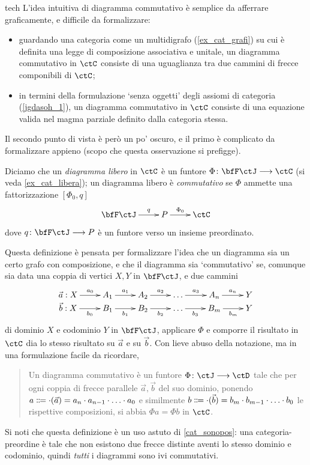 \begin{hRemark}{tech}\label{cos_diag_comm}
 L'idea intuitiva di diagramma commutativo è semplice da afferrare graficamente, e difficile da formalizzare:
 \begin{itemize}
  \item guardando una categoria come un multidigrafo (\ref{ex_cat_grafi}) su cui è definita una legge di composizione associativa e unitale, un diagramma commutativo in \(\ctC\) consiste di una uguaglianza tra due cammini di frecce componibili di \(\ctC\);
  \item in termini della formulazione `senza oggetti' degli assiomi di categoria (\ref{jgdasoh_1}), un diagramma commutativo in \(\ctC\) consiste di una equazione valida nel magma parziale definito dalla categoria stessa.
 \end{itemize}
 Il secondo punto di vista è però un po' oscuro, e il primo è complicato da formalizzare appieno (scopo che questa osservazione si prefigge).

 Diciamo che un \emph{diagramma libero} in \(\ctC\) è un funtore \(\Phi \colon \bfF\ctJ \fun\ctC\) (si veda \ref{ex_cat_libera}); un diagramma libero è \emph{commutativo} se \(\Phi\) ammette una fattorizzazione \([\Phi_0,q]\)
 \[\xymatrix{
  \bfF\ctJ \ar[r]^-q & P \ar[r]^-{\Phi_0} & \ctC
  }\]
 dove \(q \colon \bfF\ctJ \fun P\) è un funtore verso un insieme preordinato.

 Questa definizione è pensata per formalizzare l'idea che un diagramma sia un certo grafo con composizione, e che il diagramma sia `commutativo' se, comunque sia data una coppia di vertici \(X,Y\) in \(\bfF\ctJ\), e due cammini
 \[\xymatrix@R=0cm{
  \vec a : X \ar[r]^-{a_0} & A_1 \ar[r]^-{a_1} & A_2 \ar[r]^-{a_2}  & \dots \ar[r]^-{a_3} & A_n \ar[r]^-{a_n} & Y\\
  \vec b : X \ar[r]_-{b_0} & B_1 \ar[r]_-{b_1} & B_2 \ar[r]_-{b_2} & \dots \ar[r]_-{b_3} & B_m \ar[r]_-{b_m} & Y
  }\]
 di dominio \(X\) e codominio \(Y\) in \(\bfF\ctJ\), applicare \(\Phi\) e comporre il risultato in \(\ctC\) dia lo stesso risultato su \(\vec a\) e su \(\vec b\). Con lieve abuso della notazione, ma in una formulazione facile da ricordare,
 \begin{quote}
  Un diagramma commutativo è un funtore \(\Phi \colon \ctJ \fun\ctD\) tale che per ogni coppia di frecce parallele \(\vec a,\vec b\) del suo dominio, ponendo \(a\defeq \cmp(\vec a) = a_n\cmp a_{n-1}\cmp\dots\cmp a_0\) e similmente \(b\defeq \cmp(\vec b) = b_m\cmp b_{m-1}\cmp\dots\cmp b_0\) le rispettive composizioni, si abbia \(\Phi a = \Phi b\) in \(\ctC\).
 \end{quote}
 Si noti che questa definizione è un uso astuto di \ref{cat_sonopos}: una categoria-preordine è tale che non esistono due frecce distinte aventi lo stesso dominio e codominio, quindi \emph{tutti} i diagrammi sono ivi commutativi.
\end{hRemark}
